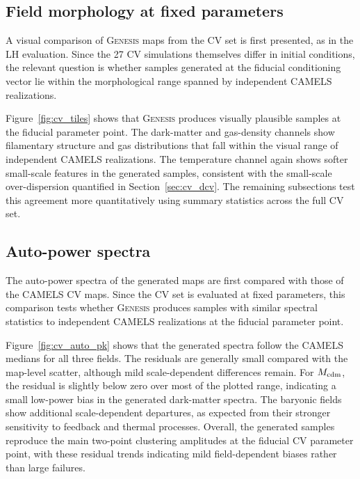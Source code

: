 \documentclass[usenatbib]{mnras}
\newcommand{\Mcdm}{M_{\rm cdm}}
\begin{document}
\subsection{Field morphology at fixed parameters}
\label{sec:cv_tiles}

A visual comparison of \textsc{Genesis} maps from the CV set is first
presented, as in the LH evaluation. Since the 27 CV simulations
themselves differ in initial conditions, the relevant question is
whether samples generated at the fiducial conditioning vector lie
within the morphological range spanned by independent CAMELS
realizations.

Figure~\ref{fig:cv_tiles} shows that \textsc{Genesis} produces
visually plausible samples at the fiducial parameter point. The
dark-matter and gas-density channels show filamentary structure and
gas distributions that fall within the visual range of independent
CAMELS realizations. The temperature channel again shows softer
small-scale features in the generated samples, consistent with the
small-scale over-dispersion quantified in Section~\ref{sec:cv_dcv}.
The remaining subsections test this agreement more quantitatively
using summary statistics across the full CV set.

\subsection{Auto-power spectra}
\label{sec:cv_auto_pk}

The auto-power spectra of the generated maps are first compared with
those of the CAMELS CV maps. Since the CV set is evaluated at fixed
parameters, this comparison tests whether \textsc{Genesis} produces
samples with similar spectral statistics to independent CAMELS
realizations at the fiducial parameter point.

Figure~\ref{fig:cv_auto_pk} shows that the generated spectra follow
the CAMELS medians for all three fields. The residuals are generally
small compared with the map-level scatter, although mild
scale-dependent differences remain. For $\Mcdm$, the residual is
slightly below zero over most of the plotted range, indicating a small
low-power bias in the generated dark-matter spectra. The baryonic
fields show additional scale-dependent departures, as expected from
their stronger sensitivity to feedback and thermal processes.
Overall, the generated samples reproduce the main two-point
clustering amplitudes at the fiducial CV parameter point, with these
residual trends indicating mild field-dependent biases rather than
large failures.
\end{document}
